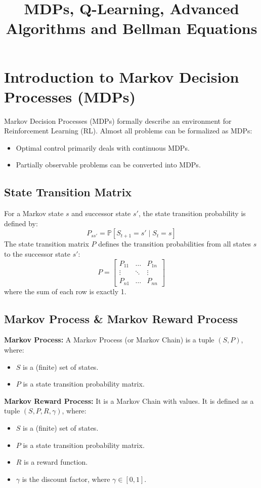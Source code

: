 \documentclass[12pt]{article}
\title{\textbf{MDPs, Q-Learning, Advanced Algorithms and Bellman Equations}}
\author{}
\date{}
\begin{document}
\maketitle

\vspace{0.5cm}
\vspace{1cm}

\section{Introduction to Markov Decision Processes (MDPs)}

Markov Decision Processes (MDPs) formally describe an environment for Reinforcement Learning (RL). Almost all problems can be formalized as MDPs:
\begin{itemize}
    \item Optimal control primarily deals with continuous MDPs.
    \item Partially observable problems can be converted into MDPs.
\end{itemize}

\subsection{State Transition Matrix}
For a Markov state $s$ and successor state $s'$, the state transition probability is defined by:
\[ P_{ss'} = \mathbb{P}[S_{t+1} = s' \mid S_t = s] \]
The state transition matrix $P$ defines the transition probabilities from all states $s$ to the successor state $s'$:
\[
P = 
\begin{bmatrix}
P_{11} & \dots & P_{1n} \\
\vdots & \ddots & \vdots \\
P_{n1} & \dots & P_{nn}
\end{bmatrix}
\]
where the sum of each row is exactly 1.

\subsection{Markov Process \& Markov Reward Process}
\textbf{Markov Process:} A Markov Process (or Markov Chain) is a tuple $(S, P)$, where:
\begin{itemize}
    \item $S$ is a (finite) set of states.
    \item $P$ is a state transition probability matrix.
\end{itemize}

\textbf{Markov Reward Process:} It is a Markov Chain with values. It is defined as a tuple $(S, P, R, \gamma)$, where:
\begin{itemize}
    \item $S$ is a (finite) set of states.
    \item $P$ is a state transition probability matrix.
    \item $R$ is a reward function.
    \item $\gamma$ is the discount factor, where $\gamma \in [0, 1]$.
\end{itemize}
\end{document}
